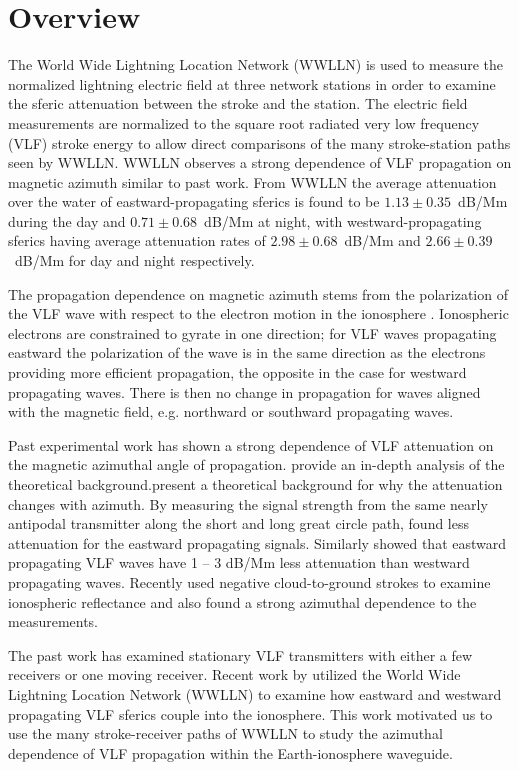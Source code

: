 \section{Overview}

The World Wide Lightning Location Network (WWLLN) is used to measure the normalized lightning electric field at three network stations in order to examine the sferic attenuation between the stroke and the station.
The electric field measurements are normalized to the square root radiated very low frequency (VLF) stroke energy to allow direct comparisons of the many stroke-station paths seen by WWLLN.
WWLLN observes a strong dependence of VLF propagation on magnetic azimuth similar to past work.
From WWLLN the average attenuation over the water of eastward-propagating sferics is found to be $1.13 \pm 0.35$~dB/Mm during the day and $0.71 \pm 0.68$~dB/Mm at night, with westward-propagating sferics having average attenuation rates of $2.98 \pm 0.68$~dB/Mm and $2.66 \pm 0.39$~dB/Mm for day and night respectively.

The propagation dependence on magnetic azimuth stems from the polarization of the VLF wave with respect to the electron motion in the ionosphere .
Ionospheric electrons are constrained to gyrate in one direction; for VLF waves propagating eastward the polarization of the wave is in the same direction as the electrons providing more efficient propagation, the opposite in the case for westward propagating waves.
There is then no change in propagation for waves aligned with the magnetic field, e.g. northward or southward propagating waves.

Past experimental work has shown a strong dependence of VLF attenuation on the magnetic azimuthal angle of propagation.
\citet{Wait1960a} provide an in-depth analysis of the theoretical background.present a theoretical background for why the attenuation changes with azimuth.
By measuring the signal strength from the same nearly antipodal transmitter along the short and long great circle path, \citet{Crombie1958} found less attenuation for the eastward propagating signals.
Similarly \citet{Taylor1960a} showed that eastward propagating VLF waves have 1 -- 3 dB/Mm less attenuation than westward propagating waves.
Recently \citet{Jacobson2012} used negative cloud-to-ground strokes to examine ionospheric reflectance and also found a strong azimuthal dependence to the measurements.

The past work has examined stationary VLF transmitters with either a few receivers or one moving receiver.
Recent work by \citet{Burkholder2013} utilized the World Wide Lightning Location Network (WWLLN) to examine how eastward and westward propagating VLF sferics couple into the ionosphere.
This work motivated us to use the many stroke-receiver paths of WWLLN to study the azimuthal dependence of VLF propagation within the Earth-ionosphere waveguide.

